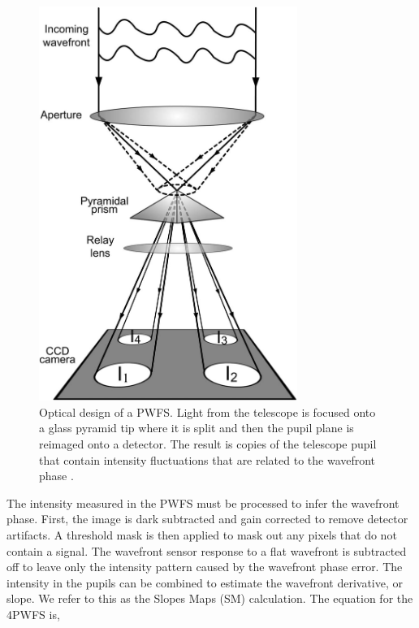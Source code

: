 \begin{figure}
    \centering
    \includegraphics[width=0.75\textwidth]{Chapter Materials/Chapter Three Materials/pyramidDiagram.jpg}
    \caption{Optical design of a PWFS. Light from the telescope is focused onto a glass pyramid tip where it is split and then the pupil plane is reimaged onto a detector. The result is copies of the telescope pupil that contain intensity fluctuations that are related to the wavefront phase \citep{shatokhina2014fast}.}
    \label{fig:pyramid}
\end{figure}


The intensity measured in the PWFS must be processed to infer the wavefront phase. First, the image is dark subtracted and gain corrected to remove detector artifacts. A threshold mask is then applied to mask out any pixels that do not contain a signal. The wavefront sensor response to a flat wavefront is subtracted off to leave only the intensity pattern caused by the wavefront phase error. The intensity in the pupils can be combined to estimate the wavefront derivative, or slope. We refer to this as the Slopes Maps (SM) calculation. The equation for the 4PWFS is,


